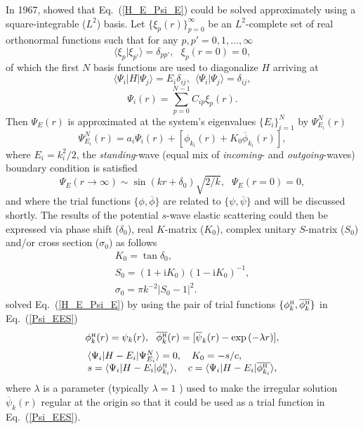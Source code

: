 \documentclass[aip
, pra
, showpacs
, aps
, twocolumn
, groupedaddress
, floatfix
]{revtex4}
\newcommand{\beq}{\begin{equation}}
\newcommand{\eeq}{\end{equation}}
\newcommand{\barr}{\begin{array}}
\newcommand{\earr}{\end{array}}
\newcommand{\phiH}{\phi^{\mbox{\tiny{H}}}}
\begin{document}
In 1967, \citet{Harris67} showed that Eq.~(\ref{H_E_Psi_E}) could be solved
approximately using a square-integrable ($L^2$) basis.
Let $\{\xi_p(r)\}_{p=0}^\infty$ be an $L^2$-complete set of real orthonormal functions
such that for any $p,p'=0,1,...,\infty$
\beq
\langle \xi_p | \xi_{p'} \rangle=\delta_{pp'}, \ \ \ \xi_p(r=0)=0,
\eeq
of which the first $N$ basis functions are used to diagonalize $H$ arriving at
\beq
\langle \Psi_i |H| \Psi_j \rangle = E_i \delta_{ij} , \ \ \langle \Psi_i | \Psi_j \rangle=\delta_{ij},
\eeq
\beq
\Psi_i(r) = \sum_{p=0}^{N-1} C_{ip} \xi_p(r).
\eeq
Then $\Psi_E(r)$ is approximated at the system's eigenvalues $\{E_i\}_{i=1}^{N}$ by $\Psi^N_{E_i}(r)$
\cite{Harris67}
\beq
\Psi^N_{E_i}(r) = a_i \Psi_i(r)  + [\phi_{k_i}(r)  + K_{0} \overline{\phi}_{k_i}(r)],
\label{Psi_EES} \eeq
where $E_i=k_i^2/2$, the {\em standing}-wave (equal mix of {\em incoming}- and {\em outgoing}-waves) boundary condition is satisfied
\beq
\Psi_E(r \rightarrow \infty) \sim  \sin(kr+\delta_0) \sqrt{2/k}, \ \ \ \Psi_E(r= 0)=0,   \label{stand_wave}
\eeq
and where the trial functions $\{\phi,\overline{\phi}\}$ are related to $\{\psi,\overline{\psi}\}$ and will be discussed shortly.
The results of the potential $s$-wave elastic scattering could then be expressed via
phase shift ($\delta_0$), real $K$-matrix ($K_0$), complex unitary $S$-matrix ($S_{0}$) and/or cross section ($\sigma_{0}$)
as follows
\beq \barr{l}
K_{0} = \tan{\delta_0},\\
S_{0}=(1+\mbox{i}K_0)(1-\mbox{i}K_0)^{-1}, \\
\sigma_{0}=\pi k^{-2} |S_{0}-1|^2.
\earr \eeq
\citet{Harris67} solved Eq.~(\ref{H_E_Psi_E}) by using the pair of trial functions $\{\phiH_k, \overline{\phiH_{k}} \}$ in
Eq.~(\ref{Psi_EES})
\beq \barr{l}
\phiH_k(r) =  \psi_k(r),\ \
\overline{\phiH_k}(r) =  [\overline{\psi}_k(r) - \exp{(-\lambda r)}],
\earr \label{def_phi_H} \eeq
\beq \barr{l}
\langle\Psi_i|H-E_i|\Psi^N_{E_i}\rangle=0,\ \ \
K_{0} = - s / c, \\
s = \langle\Psi_i|H-E_i|  \phiH_{k_i} \rangle, \ \ \
c = \langle\Psi_i|H-E_i|  \overline{\phiH_{k_i}} \rangle,
\earr \label{K_0_Harris} \eeq
where $\lambda$ is a parameter (typically $\lambda=1$ \cite{Nesbet68}) used to make the irregular solution $\overline{\psi}_k(r)$ regular
at the origin so that it could be used as a trial function in Eq.~(\ref{Psi_EES}).
\end{document}
